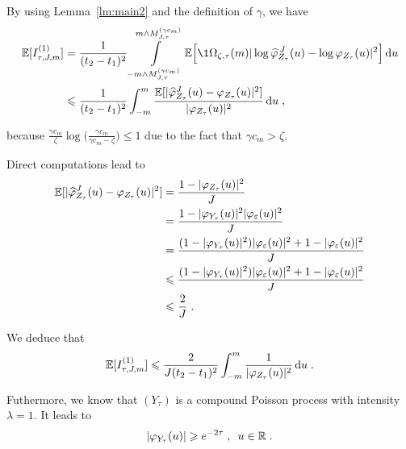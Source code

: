By using Lemma~\ref{lm:main2} and the definition of $\gamma$, we have
    \begin{subequations}
    \begin{align*}
        \espe[I_{\tau, J, m}^{(1)}]
		&= \frac{1}{(t_2 - t_1)^2}
		\int\limits_{-m \wedge M_{J, \tau}^{(\gamma c_m)}}^{m \wedge M_{J, \tau}^{(\gamma c_m)}} \E \Big[  \1{\Omega_{\zeta, \tau}(m)}
		|\log \hat \varphi_{Z_{\tau}}^{\, J}  (u) - \log\varphi_{Z_{\tau}} (u)|^2 \Big] \du \\
        &\leq \frac{1}{(t_2 - t_1)^2}  \int_{-m}^{m} 
        \frac{\espe[|\hat \varphi_{Z_\tau}^J(u) - \varphi_{Z_{\tau}}(u)|^2]}{|\varphi_{Z_{\tau}}(u)|^2} \du
        \eqfinv
    \end{align*}
    \end{subequations}

because $\frac{\gamma c_m}{\zeta} \log \big(\frac{\gamma c_m}{\gamma c_m - \zeta} \big) \leq 1$ due to the fact that $\gamma c_m > \zeta$.  

    
Direct computations lead to
    \begin{subequations}
    \begin{align*}
       \mathbb{E}[|\widehat \varphi_{Z_\tau}^J(u) - \varphi_{Z_\tau}(u)|^2]
        &= \frac{1 - |\varphi_{Z_{\tau}}(u)|^2}{J} \\
        &= \frac{1 - |\varphi_{Y_{\tau}}(u)|^2 |\varphi_{\varepsilon}(u)|^2}{J} \\
        &= \frac{(1 - |\varphi_{Y_{\tau}}(u)|^2) |\varphi_{\varepsilon}(u)|^2 + 1 - |\varphi_{\varepsilon}(u)|^2 }{J} \\
        &\leqslant \frac{(1 - |\varphi_{Y_{\tau}}(u)|^2) |\varphi_{\varepsilon}(u)|^2 + 1 - |\varphi_{\varepsilon}(u)|^2 }{J} \\
        &\leqslant \frac{2}{J}
        \; .
    \end{align*}
    \end{subequations}
    
    
We deduce that
    \begin{equation*}
        \mathbb{E}[I_{\tau, J, m}^{(1)}]
        \leqslant 
        \frac{2}{J (t_2 - t_1)^2}  \int_{-m}^{m} 
        \frac{1}{|\varphi_{Z_{\tau}}(u)|^2} \, \mathrm du
        \; .
    \end{equation*}
    
Futhermore, we know that $(Y_\tau)$ is a compound Poisson process with intensity $\lambda = 1$. It leads to 
	\begin{equation*}
	|\varphi_{Y_\tau}(u)| \geqslant e^{-2\tau} 
	\; , \enspace
	u \in \mathbb{R}
	\; .
	\end{equation*}


